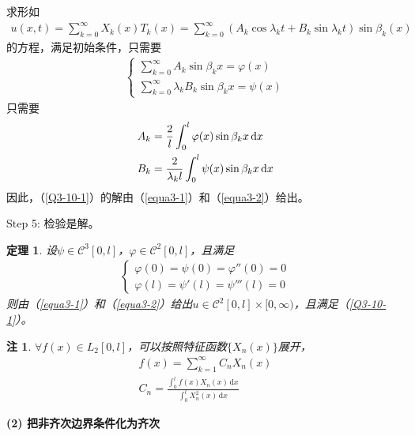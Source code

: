 \documentclass[11pt, a4paper]{article}
\theoremstyle{theorem}
\newtheorem{thm}{定理}[section]
\newtheorem*{note}{注}
\newcommand{\intd}[1]{\,\mathrm{d}{#1}}
\begin{document}
    求形如
    \begin{align}
    \label{equa3-1}
        u(x,t) = \sum_{k=0}^\infty X_k(x)T_k(x) = \sum_{k=0}^\infty \left(A_k \cos \lambda_k t + B_k \sin \lambda_k t \right) \sin \beta_k(x)
    \end{align}
    的方程，满足初始条件，只需要
    \begin{align*}
        \begin{cases}
        \sum_{k=0}^\infty A_k \sin \beta_k x = \varphi(x)\\
        \sum_{k=0}^\infty \lambda_k B_k \sin \beta_k x = \psi(x)
        \end{cases}
    \end{align*}
    只需要
    \begin{align}
    \label{equa3-2}
        A_k &= \frac{2}{l} \int_0^l \varphi(x) \sin \beta_k x \intd x \notag\\
        B_k &= \frac{2}{\lambda_k l} \int_0^l \psi(x) \sin \beta_k x \intd x
    \end{align}
    因此，（\ref{Q3-10-1}）的解由（\ref{equa3-1}）和（\ref{equa3-2}）给出。

    Step 5: 检验是解。

\begin{thm}
设$\psi \in \mathcal{C}^3[0,l]$，$\varphi \in \mathcal{C}^2[0,l]$，且满足
\begin{align}
    \begin{cases}
        \varphi(0) = \psi(0) = \varphi''(0) = 0 \\
        \varphi(l) = \psi'(l) = \psi'''(l) = 0
    \end{cases}
\end{align}
则由（\ref{equa3-1}）和（\ref{equa3-2}）给出$u \in \mathcal{C}^2[0,l] \times [0,\infty)$，且满足（\ref{Q3-10-1}）。
\end{thm}

\begin{note}
$\forall f(x) \in L_2[0,l]$，可以按照特征函数$\{X_n(x)\}$展开，
\begin{align*}
    f(x) = \sum_{k=1}^\infty C_n X_n(x) \\
    C_n = \frac{\int_0^l f(x)X_n(x) \intd x}{\int_0^l X_n^2(x) \intd x}
\end{align*}
\end{note}

\textbf{(2) 把非齐次边界条件化为齐次}
\end{document}
